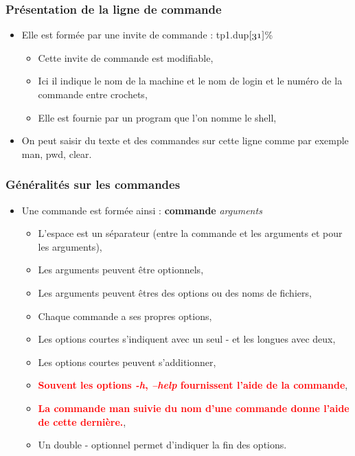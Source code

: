 \documentclass[handout,10pt]{beamer}
\begin{document}
\frame
{
    \frametitle{Présentation de la ligne de commande}

    \begin{itemize}
        \item Elle est formée par une invite de commande : {\ttfamily tp1.dup$\mathnormal{[31]}$\%}
            \begin{itemize}
                \item Cette invite de commande est modifiable,
                \item Ici il indique le nom de la machine et le nom de login et le numéro de la commande entre crochets,
                \item Elle est fournie par un program que l'on nomme le shell,
            \end{itemize}
        \item On peut saisir du texte et des commandes sur cette ligne comme par exemple {\ttfamily man}, {\ttfamily pwd}, {\ttfamily clear}.
    \end{itemize}
}


\frame
{
    \frametitle{Généralités sur les commandes}

    \begin{itemize}
        \item Une commande est formée ainsi : \textbf{commande} \textit{arguments}
            \begin{itemize}
                \item L'espace est un séparateur (entre la commande et les arguments et pour les arguments),
                \item Les arguments peuvent être optionnels,
                \item Les arguments peuvent êtres des options ou des noms de fichiers,
                \item Chaque commande a ses propres options,
                \item Les options courtes s'indiquent avec un seul - et les longues avec deux,
                \item Les options courtes peuvent s'additionner,
                \item \textcolor{red}{\textbf{Souvent les options \textit{-h}, \textit{--help} fournissent l'aide de la commande}},
                \item \textcolor{red}{\textbf{La commande {\ttfamily man} suivie du nom d'une commande donne l'aide de cette dernière.}},
                \item Un double - optionnel permet d'indiquer la fin des options.
            \end{itemize}
    \end{itemize}
}
\end{document}
